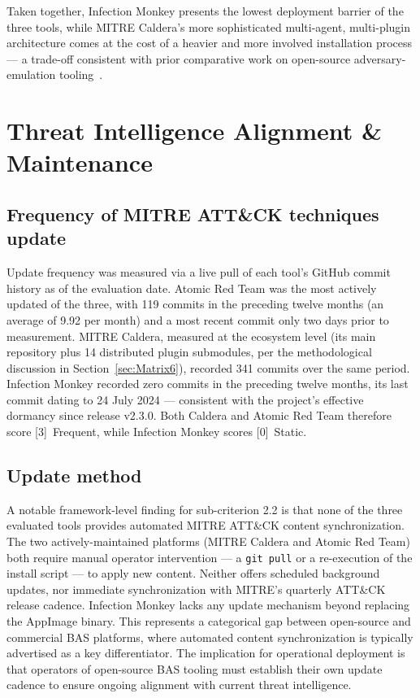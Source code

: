 Taken together, Infection Monkey presents the lowest deployment barrier of the three tools, while MITRE Caldera's more sophisticated multi-agent, multi-plugin architecture comes at the cost of a heavier and more involved installation process --- a trade-off consistent with prior comparative work on open-source adversary-emulation tooling~\cite{landauer2024}.


\section{Threat Intelligence Alignment \& Maintenance}\label{sec:Matrix2}
\subsection{Frequency of MITRE ATT\&CK techniques update}\label{sec:Update_frequency}

Update frequency was measured via a live pull of each tool's GitHub commit history as of the evaluation date. Atomic Red Team was the most actively updated of the three, with 119 commits in the preceding twelve months (an average of 9.92 per month) and a most recent commit only two days prior to measurement. MITRE Caldera, measured at the ecosystem level (its main repository plus 14 distributed plugin submodules, per the methodological discussion in Section~\ref{sec:Matrix6}), recorded 341 commits over the same period. Infection Monkey recorded zero commits in the preceding twelve months, its last commit dating to 24 July 2024 --- consistent with the project's effective dormancy since release v2.3.0. Both Caldera and Atomic Red Team therefore score [3]~Frequent, while Infection Monkey scores [0]~Static.

\subsection{Update method}\label{sec:Update_method}
A notable framework-level finding for sub-criterion 2.2 is that none of the three evaluated tools provides automated MITRE ATT\&CK content synchronization. The two actively-maintained platforms (MITRE Caldera and Atomic Red Team) both require manual operator intervention --- a \texttt{git pull} or a re-execution of the install script --- to apply new content. Neither offers scheduled background updates, nor immediate synchronization with MITRE's quarterly ATT\&CK release cadence. Infection Monkey lacks any update mechanism beyond replacing the AppImage binary. This represents a categorical gap between open-source and commercial BAS platforms, where automated content synchronization is typically advertised as a key differentiator. The implication for operational deployment is that operators of open-source BAS tooling must establish their own update cadence to ensure ongoing alignment with current threat intelligence.


